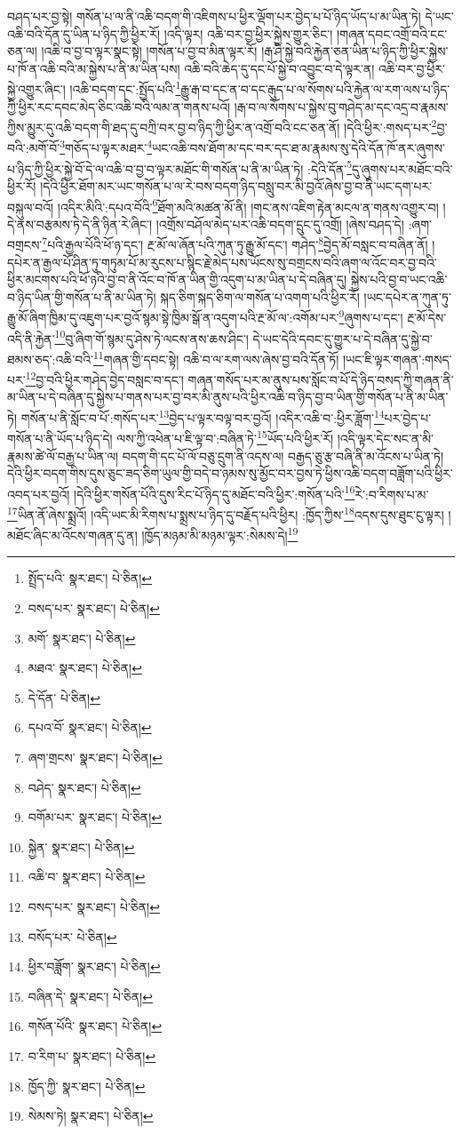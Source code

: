 བཤད་པར་བྱ་སྟེ། གསོན་པ་ལ་ནི་འཆི་བདག་གི་འཇིགས་པ་ཕྱིར་ལྡོག་པར་བྱེད་པ་པོ་ཉིད་ཡོད་པ་མ་ཡིན་ཏེ། དེ་ཡང་འཆི་བའི་དོན་དུ་ཡིན་པ་ཉིད་ཀྱི་ཕྱིར་རོ། །འདི་ལྟར། འཆི་བར་བྱ་ཕྱིར་སྐྱེས་གྱུར་ཅིང་། །གཞན་དབང་འགྲོ་བའི་ངང་ཅན་ལ། །འཆི་བ་བྱ་བ་ལྟར་སྣང་སྟེ། །གསོན་པ་བྱ་བ་མིན་ལྟར་རོ། །རྒ་ཤི་སྐྱེ་བའི་རྐྱེན་ཅན་ཡིན་པ་ཉིད་ཀྱི་ཕྱིར་སྐྱེས་པ་ཁོ་ན་འཆི་བའི་མ་སྐྱེས་པ་ནི་མ་ཡིན་པས། འཆི་བའི་ཆེད་དུ་དང་པོ་སྐྱེ་བ་འབྱུང་བ་དེ་ལྟར་ན། འཆི་བར་བྱ་ཕྱིར་སྐྱེ་འགྱུར་ཞིང་། །འཆི་བདག་དང་:སྤྱོད་པའི་\footnote{སྤྲོད་པའི་  སྣར་ཐང་།  པེ་ཅིན། }རྒྱུ་རྒ་བ་དང་ན་བ་དང་རྒུད་པ་ལ་སོགས་པའི་རྐྱེན་ལ་རག་ལས་པ་ཉིད་ཀྱི་ཕྱིར་རང་དབང་མེད་ཅིང་འཆི་བའི་ལམ་ན་གནས་པའོ། །རྒ་བ་ལ་སོགས་པ་སྐྱེས་བུ་གཤེད་མ་དང་འདྲ་བ་རྣམས་ཀྱིས་མྱུར་དུ་འཆི་བདག་གི་ཐད་དུ་བཀྲི་བར་བྱ་བ་ཉིད་ཀྱི་ཕྱིར་ན་འགྲོ་བའི་ངང་ཅན་ནོ། །དེའི་ཕྱིར་:གསད་པར་\footnote{བསད་པར་  སྣར་ཐང་།  པེ་ཅིན། }བྱ་བའི་:མགོ་བོ་\footnote{མགོ་  སྣར་ཐང་།  པེ་ཅིན། }གཅོད་པ་ལྟར་མཐར་\footnote{མཐའ་  སྣར་ཐང་།  པེ་ཅིན། }ཡང་འཆི་བས་ཐོག་མ་དང་བར་དང་ཐ་མ་རྣམས་སུ་དེའི་དོན་ཁོ་ནར་ཞུགས་པ་ཉིད་ཀྱི་ཕྱིར་སྐྱེ་བོ་དེ་ལ་འཆི་བ་བྱ་བ་ལྟར་མཐོང་གི་གསོན་པ་ནི་མ་ཡིན་ཏེ། :དེའི་དོན་\footnote{དེ་དོན་  པེ་ཅིན། }དུ་ཞུགས་པར་མཐོང་བའི་ཕྱིར་རོ། །དེའི་ཕྱིར་ཐོག་མར་ཡང་གསོན་པ་ལ་རེ་བས་བདག་ཉིད་བསླུ་བར་མི་བྱའོ་ཞེས་བྱ་བ་ནི་ཡང་དག་པར་བསྐུལ་བའོ། །འདིར་མིའི་:དཔའ་བོའི་\footnote{དཔའ་བོ་  སྣར་ཐང་།  པེ་ཅིན། }ཐོག་མའི་མཚན་མོ་ནི། །གང་ནས་འཇིག་རྟེན་མངལ་ན་གནས་འགྱུར་བ། །དེ་ནས་བརྩམས་ཏེ་དེ་ནི་ཉིན་རེ་ཞིང་། །འགྲོས་བཤོལ་མེད་པར་འཆི་བདག་དྲུང་དུ་འགྲོ། །ཞེས་བཤད་དེ། :ཞག་བགྲངས་\footnote{ཞག་གྲངས་  སྣར་ཐང་།  པེ་ཅིན། }པའི་རྒྱལ་པོའི་ཕོ་ཉ་དང་། རྔ་མོ་ལ་ཞོན་པའི་ཀུན་ཏུ་རྒྱུ་མོ་དང་། གཤེད་\footnote{བཤེད་  སྣར་ཐང་།  པེ་ཅིན། }བྱེད་མོ་བསླང་བ་བཞིན་ནོ། །དཔེར་ན་རྒྱལ་པོ་ཤིན་ཏུ་གཏུམ་པོ་མ་རུངས་པ་སྙིང་རྗེ་མེད་པས་ཡོངས་སུ་བགྲངས་བའི་ཞག་ལ་འོང་བར་བྱ་བའི་ཕྱིར་མངགས་པའི་ཕོ་ཉའི་བྱ་བ་ནི་འོང་བ་ཁོ་ན་ཡིན་གྱི་འདུག་པ་མ་ཡིན་པ་དེ་བཞིན་དུ། སྐྱེས་པའི་བྱ་བ་ཡང་འཆི་བ་ཉིད་ཡིན་གྱི་གསོན་པ་ནི་མ་ཡིན་ཏེ། སྐད་ཅིག་སྐད་ཅིག་ལ་གསོན་པ་འགག་པའི་ཕྱིར་རོ། །ཡང་དཔེར་ན་ཀུན་ཏུ་རྒྱུ་མོ་ཞིག་ཁྱིམ་དུ་འཇུག་པར་བྱའོ་སྙམ་སྟེ་ཁྱིམ་སྒོ་ན་འདུག་པའི་རྔ་མོ་ལ་:འགོམ་པར་\footnote{བགོམ་པར་  སྣར་ཐང་།  པེ་ཅིན། }ཞུགས་པ་དང་། རྔ་མོ་དེས་འདི་ནི་རྐྱེན་\footnote{སྐྱེན་  སྣར་ཐང་།  པེ་ཅིན། }བུ་ཞིག་གོ་སྙམ་དུ་ཤེས་ཏེ་ལངས་ནས་ཆས་ཤིང་། དེ་ཡང་དེའི་དབང་དུ་གྱུར་པ་དེ་བཞིན་དུ་སྐྱེ་བ་ཐམས་ཅད་:འཆི་བའི་\footnote{འཆི་བ་  སྣར་ཐང་།  པེ་ཅིན། }གཞན་གྱི་དབང་སྟེ། འཆི་བ་ལ་རག་ལས་ཞེས་བྱ་བའི་དོན་ཏོ། །ཡང་ཇི་ལྟར་གཞན་:གསད་པར་\footnote{བསད་པར་  སྣར་ཐང་།  པེ་ཅིན། }བྱ་བའི་ཕྱིར་གཤེད་བྱེད་བསླང་བ་དང་། གཞན་གསོད་པར་མ་ནུས་པས་སློང་བ་པོ་དེ་ཉིད་བསད་ཀྱི་གཞན་ནི་མ་ཡིན་པ་དེ་བཞིན་དུ་སྐྱེས་པ་གནས་པར་བྱ་བར་མི་ནུས་པའི་ཕྱིར་འཆི་བ་ཉིད་བྱ་བ་ཡིན་གྱི་གསོན་པ་ནི་མ་ཡིན་ཏེ། གསོན་པ་ནི་སློང་བ་པོ་:གསོད་པར་\footnote{བསོད་པར་  པེ་ཅིན། }བྱེད་པ་ལྟར་བལྟ་བར་བྱའོ། །འདིར་འཆི་བ་:ཕྱིར་ཟློག་\footnote{ཕྱིར་བཟློག་  སྣར་ཐང་།  པེ་ཅིན། }པར་བྱེད་པ་གསོན་པ་ནི་ཡོད་པ་ཉིད་དེ། ལས་ཀྱི་འཕེན་པ་ཇི་ལྟ་བ་:བཞིན་ཏེ་\footnote{བཞིན་དེ་  སྣར་ཐང་།  པེ་ཅིན། }ཡོད་པའི་ཕྱིར་རོ། །འདི་ལྟར་དེང་སང་ན་མི་རྣམས་ཚེ་ལོ་བརྒྱ་པ་ཡིན་ལ། བདག་གི་དང་པོ་ལོ་བཅུ་དྲུག་ནི་འདས་ལ། བརྒྱད་ཅུ་རྩ་བཞི་ནི་མ་འོངས་པ་ཡིན་ཏེ། དེའི་ཕྱིར་བདག་གིས་དུས་ཅུང་ཟད་ཅིག་ཡུལ་གྱི་བདེ་བ་ཉམས་སུ་མྱོང་བར་བྱས་ཏེ་ཕྱིས་འཆི་བདག་བཟློག་པའི་ཕྱིར་འབད་པར་བྱའོ། །དེའི་ཕྱིར་གསོན་པོའི་དུས་རིང་པོ་ཉིད་དུ་མཐོང་བའི་ཕྱིར་:གསོན་པའི་\footnote{གསོན་པོའི་  སྣར་ཐང་།  པེ་ཅིན། }རེ་:བ་རིགས་པ་མ་\footnote{བ་རིག་པ་  སྣར་ཐང་།  པེ་ཅིན། }ཡིན་ནོ་ཞེས་སྨྲའོ། །འདི་ཡང་མི་རིགས་པ་སྨྲས་པ་ཉིད་དུ་བརྗོད་པའི་ཕྱིར། :ཁྱོད་ཀྱིས་\footnote{ཁྱོད་ཀྱི་  སྣར་ཐང་།  པེ་ཅིན། }འདས་དུས་ཐུང་ངུ་ལྟར། །མཐོང་ཞིང་མ་འོངས་གཞན་དུ་ན། །ཁྱོད་མཉམ་མི་མཉམ་ལྟར་:སེམས་དེ།\footnote{སེམས་ཏེ།  སྣར་ཐང་།  པེ་ཅིན། } 